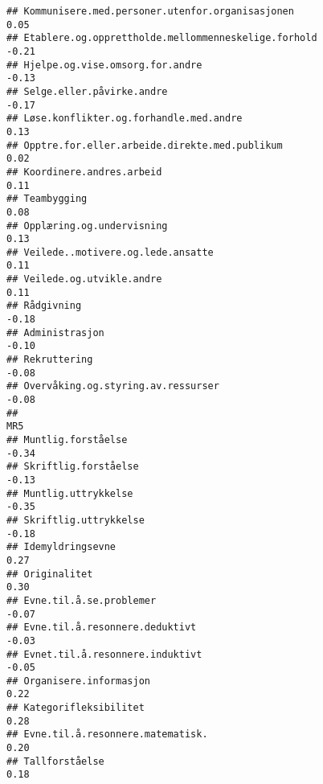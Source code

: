\documentclass[
]{article}
\begin{document}
\begin{verbatim}
## Kommunisere.med.personer.utenfor.organisasjonen                                   0.05
## Etablere.og.opprettholde.mellommenneskelige.forhold                              -0.21
## Hjelpe.og.vise.omsorg.for.andre                                                  -0.13
## Selge.eller.påvirke.andre                                                        -0.17
## Løse.konflikter.og.forhandle.med.andre                                            0.13
## Opptre.for.eller.arbeide.direkte.med.publikum                                     0.02
## Koordinere.andres.arbeid                                                          0.11
## Teambygging                                                                       0.08
## Opplæring.og.undervisning                                                         0.13
## Veilede..motivere.og.lede.ansatte                                                 0.11
## Veilede.og.utvikle.andre                                                          0.11
## Rådgivning                                                                       -0.18
## Administrasjon                                                                   -0.10
## Rekruttering                                                                     -0.08
## Overvåking.og.styring.av.ressurser                                               -0.08
##                                                                                    MR5
## Muntlig.forståelse                                                               -0.34
## Skriftlig.forståelse                                                             -0.13
## Muntlig.uttrykkelse                                                              -0.35
## Skriftlig.uttrykkelse                                                            -0.18
## Idemyldringsevne                                                                  0.27
## Originalitet                                                                      0.30
## Evne.til.å.se.problemer                                                          -0.07
## Evne.til.å.resonnere.deduktivt                                                   -0.03
## Evnet.til.å.resonnere.induktivt                                                  -0.05
## Organisere.informasjon                                                            0.22
## Kategorifleksibilitet                                                             0.28
## Evne.til.å.resonnere.matematisk.                                                  0.20
## Tallforståelse                                                                    0.18

\end{verbatim}
\end{document}
